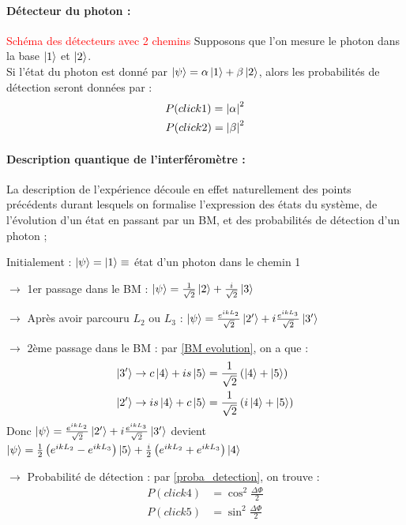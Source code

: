 \documentclass[../notesdecours.tex]{subfiles}
\begin{document}
\paragraph{Détecteur du photon :} \textcolor{red}{Schéma des détecteurs avec 2 chemins} Supposons que l'on mesure le photon dans la base $\ket{1}$ et $\ket{2}$. \\
Si l'état du photon est donné par $\ket{\psi} = \alpha\ket{1}+\beta\ket{2}$, alors les probabilités de détection seront données par : 
\begin{align}
    P(click 1) = \left| \alpha \right|^2 \notag \\
    P(click 2) = \left| \beta \right|^2 
\end{align}\label{proba_detection} 

\paragraph{Description quantique de l'interféromètre : }
La description de l'expérience découle en effet naturellement des points précédents durant lesquels on formalise l'expression des états du système, de l'évolution d'un état en passant par un BM, et des probabilités de détection d'un photon ;
\begin{description}
    \item Initialement : $\ket{\psi} = \ket{1} \equiv$ état d'un photon dans le chemin 1
    \item $\rightarrow$ 1er passage dans le BM : $\ket{\psi} = \frac{1}{\sqrt{2}} \ket{2} + \frac{i}{\sqrt{2}} \ket{3}$ 
    \item $\rightarrow$ Après avoir parcouru $L_2$ ou $L_3$ : $\ket{\psi} = \frac{e^{ikL_2}}{\sqrt{2}} \ket{2'} + i \frac{e^{ikL_3}}{\sqrt{2}} \ket{3'}$
    \item $\rightarrow$ 2ème passage dans le BM : par \eqref{BM evolution}, on a que : 
    \begin{align}
    \ket{3'} &\rightarrow c\ket{4} + is\ket{5} = \frac{1}{\sqrt{2}} \left( \ket{4} + \ket{5} \right) \notag\\
    \ket{2'} &\rightarrow is\ket{4} + c\ket{5} = \frac{1}{\sqrt{2}} \left( i \ket{4} + \ket{5} \right) 
    \end{align}
    Donc $\ket{\psi} = \frac{e^{ikL_2}}{\sqrt{2}} \ket{2'} + i \frac{e^{ikL_3}}{\sqrt{2}} \ket{3'}$ devient $\ket{\psi} = \frac{1}{2}\left( e^{ikL_2} - e^{ikL_3} \right) \ket{5} + \frac{i}{2} \left( e^{ikL_2} + e^{ikL_3} \right) \ket{4}$
    \item $\rightarrow$ Probabilité de détection : par \eqref{proba_detection}, on trouve : 
    \begin{align}
    P(click 4) &= \cos^2 \frac{\Delta \Phi}{2}\\
    P(click 5) &= \sin^2 \frac{\Delta \Phi}{2}
    \end{align}
\end{description}
\end{document}
